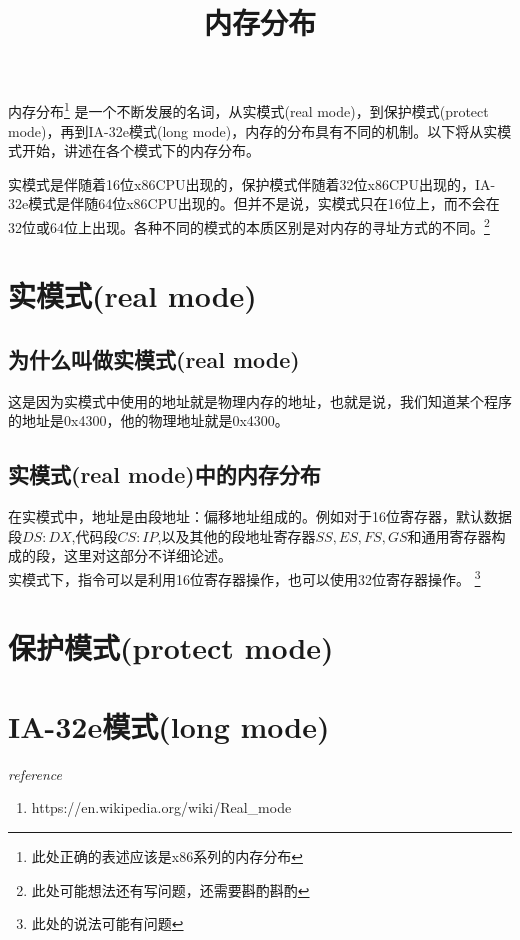 \documentclass{article}
\begin{document}
\title{内存分布}
\maketitle

内存分布\footnote{此处正确的表述应该是x86系列的内存分布} 是一个不断发展的名词，从实模式(real mode)，到保护模式(protect mode)，再到IA-32e模式(long mode)，内存的分布具有不同的机制。以下将从实模式开始，讲述在各个模式下的内存分布。

实模式是伴随着16位x86CPU出现的，保护模式伴随着32位x86CPU出现的，IA-32e模式是伴随64位x86CPU出现的。但并不是说，实模式只在16位上，而不会在32位或64位上出现。各种不同的模式的本质区别是对内存的寻址方式的不同。\footnote{此处可能想法还有写问题，还需要斟酌斟酌}
\section{实模式(real mode)}

\subsection{为什么叫做实模式(real mode)}
 这是因为实模式中使用的地址就是物理内存的地址，也就是说，我们知道某个程序的地址是0x4300，他的物理地址就是0x4300。

\subsection{实模式(real mode)中的内存分布}
在实模式中，地址是由段地址：偏移地址组成的。例如对于16位寄存器，默认数据段$DS:DX$,代码段$CS:IP$,以及其他的段地址寄存器$SS, ES, FS, GS$和通用寄存器构成的段，这里对这部分不详细论述。 \\
实模式下，指令可以是利用16位寄存器操作，也可以使用32位寄存器操作。 \footnote{此处的说法可能有问题}



\section{保护模式(protect mode)}

\section{IA-32e模式(long mode)}

\emph{reference}
\begin{enumerate}
  \item{https://en.wikipedia.org/wiki/Real_mode}
\end{enumerate}
\end{document}
